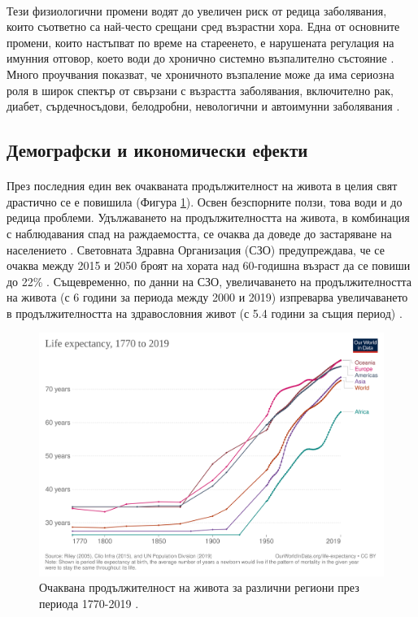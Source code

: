 \documentclass[pdftex,cyrillic,14pt,a4page,twoside,openright]{extreport}
\begin{document}
\paragraph{}
Тези физиологични промени водят до увеличен риск от редица заболявания, които съответно са най-често срещани сред възрастни хора. Една от основните промени, които настъпват по време на стареенето, е нарушената регулация на имунния отговор, което води до хронично системно възпалително състояние \cite{curwen2004}. Много проучвания показват, че хроничното възпаление може да има сериозна роля в широк спектър от свързани с възрастта заболявания, включително рак, диабет, сърдечносъдови, белодробни, невологични и автоимунни заболявания \cite{khansari2009, kuzhuvelil2008}.

\subsection{Демографски и икономически ефекти}
\paragraph{}
През последния един век очакваната продължителност на живота в целия свят драстично се е повишила \cite{zijdeman2016} (Фигура \ref{fig:life_expectancy}). Освен безспорните ползи, това води и до редица проблеми. Удължаването на продължителността на живота, в комбинация с наблюдавания спад на раждаемостта, се очаква да доведе до застаряване на населението \cite{lutz2008}. Световната Здравна Организация (СЗО) предупреждава, че се очаква между 2015 и 2050 броят на хората над 60-годишна възраст да се повиши до 22\% \cite{who_report_ageing2015}. Същевременно, по данни на СЗО, увеличаването на продължителността на живота (с 6 години за периода между 2000 и 2019) изпреварва увеличаването в продължителността на здравословния живот (с 5.4 години за същия период) \cite{who_health2020}.

\begin{figure}[h]
  \centering
  \includegraphics[width=12cm]{figures/life-expectancy}
  \caption {Очаквана продължителност на живота за различни региони през периода 1770-2019 \cite{zijdeman2016}.}
  \label{fig:life_expectancy}
\end{figure}
\end{document}
